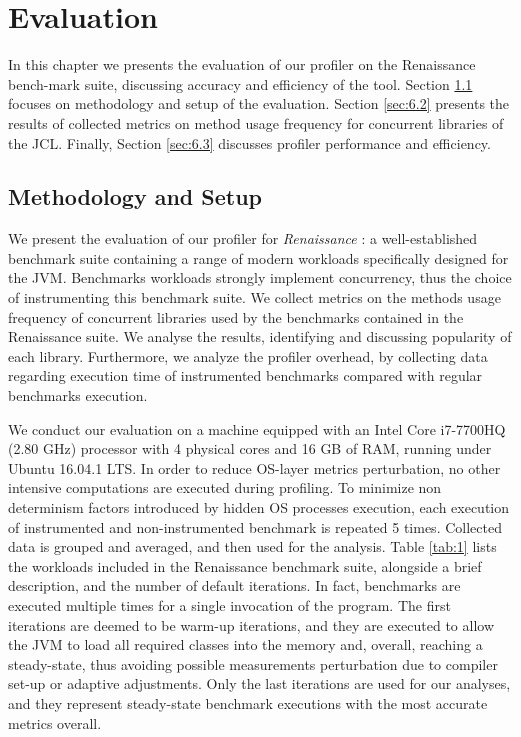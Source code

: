 \documentclass[]{usiinfthesis}
\begin{document}
\chapter{Evaluation} \label{chap:6}
In this chapter we presents the evaluation of our profiler on the Renaissance \cite{Renaissance} bench-mark suite, discussing accuracy and efficiency of the tool. Section \ref{sec:6.1} focuses on methodology and setup of the evaluation. Section \ref{sec:6.2} presents the results of collected metrics on method usage frequency for concurrent libraries of the JCL. Finally, Section \ref{sec:6.3} discusses profiler performance and efficiency.

\section{Methodology and Setup} \label{sec:6.1}
\large
We present the evaluation of our profiler for \textit{Renaissance} \cite{Renaissance}: a well-established benchmark suite containing a range of modern workloads specifically designed for the JVM. Benchmarks workloads strongly implement concurrency, thus the choice of instrumenting this benchmark suite. We collect metrics on the methods usage frequency of concurrent libraries used by the benchmarks contained in the Renaissance suite. We analyse the results, identifying and discussing popularity of each library. Furthermore, we analyze the profiler overhead, by collecting data regarding execution time of instrumented benchmarks compared with regular benchmarks execution. 

We conduct our evaluation on a machine equipped with an Intel Core i7-7700HQ (2.80 GHz) processor with 4 physical cores and 16 GB of RAM, running under Ubuntu 16.04.1 LTS. In order to reduce OS-layer metrics perturbation, no other intensive computations are executed during profiling. To minimize non determinism factors introduced by hidden OS processes execution, each execution of instrumented and non-instrumented benchmark is repeated 5 times. Collected data is grouped and averaged, and then used for the analysis. Table \ref{tab:1} lists the workloads included in the Renaissance benchmark suite, alongside a brief description, and the number of default iterations. In fact, benchmarks are executed multiple times for a single invocation of the program. The first iterations are deemed to be warm-up iterations, and they are executed to allow the JVM to load all required classes into the memory and, overall, reaching a steady-state, thus avoiding possible measurements perturbation due to compiler set-up or adaptive adjustments. Only the last iterations are used for our analyses, and they represent steady-state benchmark executions with the most accurate metrics overall.
\end{document}
